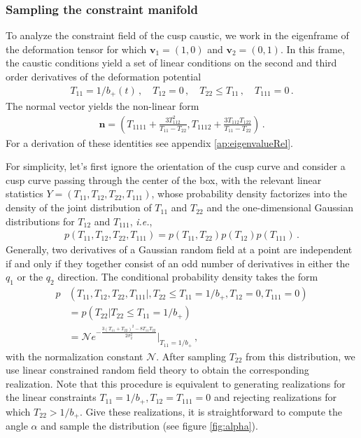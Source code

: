 \documentclass[a4paper, 11pt]{article}
\begin{document}
\subsubsection{Sampling the constraint manifold}
To analyze the constraint field of the cusp caustic, we work in the eigenframe of the deformation tensor for which $\bm{v}_1=(1,0)$ and $\bm{v}_2=(0,1)$. In this frame, the caustic conditions yield a set of linear conditions on the second and third order derivatives of the deformation potential
\begin{align}
T_{11}=1/b_+(t)\,, \quad T_{12}=0\,,\quad T_{22}\leq T_{11}\,,\quad T_{111}=0\,.\label{eq:cusp_cond_1}
\end{align}
The normal vector yields the non-linear form
\begin{align}
\bm{n}=\left(T_{1111} + \frac{3T_{112}^2}{T_{11}-T_{22}}, T_{1112} + \frac{3T_{112}T_{122}}{T_{11}-T_{22}}\right)\,.\label{eq:cusp_cond_2}
\end{align}
For a derivation of these identities see appendix \ref{ap:eigenvalueRel}.

For simplicity, let's first ignore the orientation of the cusp curve and consider a cusp curve passing through the center of the box, with the relevant linear statistics $Y=(T_{11},T_{12},T_{22},T_{111})$, whose probability density factorizes into the density of the joint distribution of $T_{11}$ and $T_{22}$ and the one-dimensional Gaussian distributions for $T_{12}$ and $T_{111}$, \textit{i.e.},
\begin{align}
p(T_{11},T_{12},T_{22},T_{111}) = p(T_{11},T_{22})p(T_{12})p(T_{111})\,.
\end{align}
Generally, two derivatives of a Gaussian random field at a point are independent if and only if they together consist of an odd number of derivatives in either the $q_1$ or the $q_2$ direction. The conditional probability density takes the form
\begin{align}
p&(T_{11},T_{12},T_{22},T_{111}|,T_{22}\leq T_{11}=1/b_+,T_{12}=0,T_{111}=0) \nonumber\\
&= p(T_{22}| T_{22} \leq T_{11}=1/b_+)\nonumber\\
&= \mathcal{N} e^{-\frac{3(T_{11} + T_{22})^2 - 8 T_{11} T_{22}}{2 \sigma_2^2}}\big|_{T_{11}=1/b_+}\,,
\end{align}
with the normalization constant $\mathcal{N}$. After sampling $T_{22}$ from this distribution, we use linear constrained random field theory to obtain the corresponding realization. Note that this procedure is equivalent to generating realizations for the linear constraints $T_{11}=1/b_+,T_{12}=T_{111}=0$ and rejecting realizations for which $T_{22} > 1/b_+$. Give these realizations, it is straightforward to compute the angle $\alpha$ and sample the distribution (see figure \ref{fig:alpha}).
\end{document}
